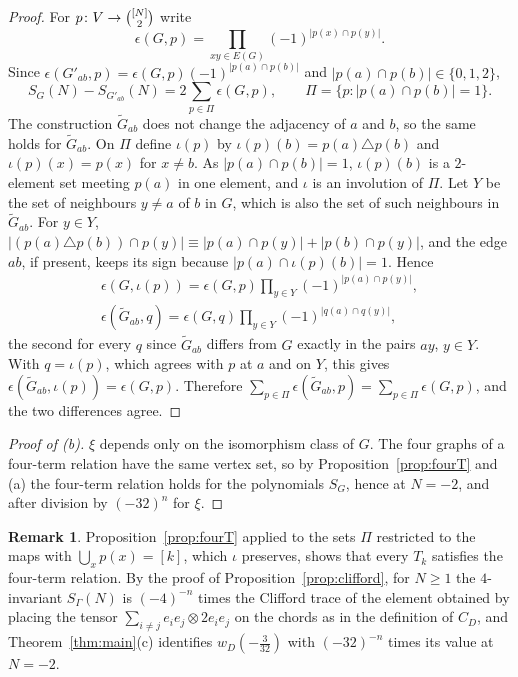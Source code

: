 \documentclass[preprint,12pt]{elsarticle}
\theoremstyle{definition}
\newtheorem{remark}[theorem]{Remark}
\newcommand{\binomset}[2]{\tbinom{#1}{#2}}
\begin{document}
\begin{proof}
For $p\colon V\to\binomset{[N]}{2}$ write
\[
\epsilon(G,p)=\prod_{xy\in E(G)}(-1)^{|p(x)\cap p(y)|}.
\]
Since $\epsilon(G'_{ab},p)=\epsilon(G,p)(-1)^{|p(a)\cap p(b)|}$ and $|p(a)\cap p(b)|\in\{0,1,2\}$,
\[
S_G(N)-S_{G'_{ab}}(N)=2\sum_{p\in\Pi}\epsilon(G,p),\qquad \Pi=\{p:|p(a)\cap p(b)|=1\}.
\]
The construction $\widetilde G_{ab}$ does not change the adjacency of $a$ and $b$, so the same holds for $\widetilde G_{ab}$. On $\Pi$ define $\iota(p)$ by $\iota(p)(b)=p(a)\triangle p(b)$ and $\iota(p)(x)=p(x)$ for $x\ne b$. As $|p(a)\cap p(b)|=1$, $\iota(p)(b)$ is a $2$-element set meeting $p(a)$ in one element, and $\iota$ is an involution of $\Pi$. Let $Y$ be the set of neighbours $y\ne a$ of $b$ in $G$, which is also the set of such neighbours in $\widetilde G_{ab}$. For $y\in Y$, $|(p(a)\triangle p(b))\cap p(y)|\equiv|p(a)\cap p(y)|+|p(b)\cap p(y)|$, and the edge $ab$, if present, keeps its sign because $|p(a)\cap\iota(p)(b)|=1$. Hence
\begin{gather*}
\epsilon(G,\iota(p))=\epsilon(G,p)\prod_{y\in Y}(-1)^{|p(a)\cap p(y)|},\\
\epsilon(\widetilde G_{ab},q)=\epsilon(G,q)\prod_{y\in Y}(-1)^{|q(a)\cap q(y)|},
\end{gather*}
the second for every $q$ since $\widetilde G_{ab}$ differs from $G$ exactly in the pairs $ay$, $y\in Y$. With $q=\iota(p)$, which agrees with $p$ at $a$ and on $Y$, this gives $\epsilon(\widetilde G_{ab},\iota(p))=\epsilon(G,p)$. Therefore $\sum_{p\in\Pi}\epsilon(\widetilde G_{ab},p)=\sum_{p\in\Pi}\epsilon(G,p)$, and the two differences agree.
\end{proof}

\begin{proof}[Proof of (b)]
$\xi$ depends only on the isomorphism class of $G$. The four graphs of a four-term relation have the same vertex set, so by Proposition~\ref{prop:fourT} and (a) the four-term relation holds for the polynomials $S_G$, hence at $N=-2$, and after division by $(-32)^n$ for $\xi$.
\end{proof}

\begin{remark}
Proposition~\ref{prop:fourT} applied to the sets $\Pi$ restricted to the maps with $\bigcup_xp(x)=[k]$, which $\iota$ preserves, shows that every $T_k$ satisfies the four-term relation. By the proof of Proposition~\ref{prop:clifford}, for $N\ge1$ the $4$-invariant $S_\Gamma(N)$ is $(-4)^{-n}$ times the Clifford trace of the element obtained by placing the tensor $\sum_{i\ne j}e_ie_j\otimes 2e_ie_j$ on the chords as in the definition of $C_D$, and Theorem~\ref{thm:main}(c) identifies $w_D(-\frac{3}{32})$ with $(-32)^{-n}$ times its value at $N=-2$.
\end{remark}
\end{document}

